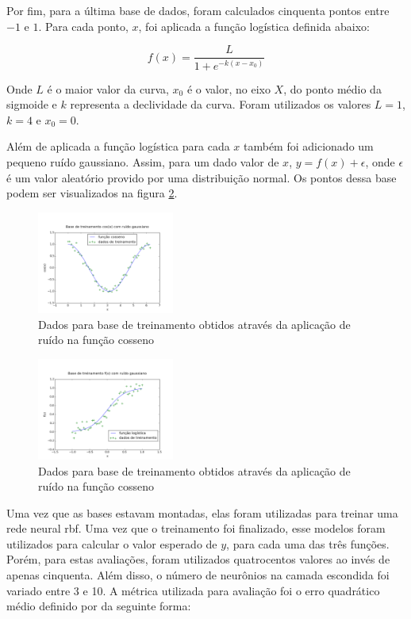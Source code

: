 \documentclass[conference]{IEEEtran}
\begin{document}
Por fim, para a última base de dados, foram calculados cinquenta pontos entre 
$-1$ e $1$. Para cada ponto, $x$, foi aplicada a função logística \cite{logist} 
definida abaixo:

$$f(x) = \frac{L}{1 + e^{-k(x-x_{0})}}$$

Onde $L$ é o maior valor da curva, $x_{0}$ é o valor, no eixo $X$, do ponto 
médio da sigmoide e $k$ representa a declividade da curva. Foram utilizados os 
valores $L = 1$, $k = 4$ e $x_{0} = 0$.

Além de aplicada a função logística para cada $x$ também foi adicionado um 
pequeno ruído gaussiano. Assim, para um dado valor de $x$, $y = f(x) + 
\epsilon$, onde $\epsilon$ é um valor aleatório provido por uma distribuição 
normal. Os pontos dessa base podem ser visualizados na figura 
\ref{fig:logistica}.

\begin{figure}[t]
	\caption{Dados para base de treinamento obtidos através da aplicação de 
		ruído na função cosseno}
	\label{fig:cosseno_dados}
	\centering
	\includegraphics[width=0.40\textwidth]{cos_5v1_train_data_paper}
\end{figure}

\begin{figure}[b]
	\caption{Dados para base de treinamento obtidos através da aplicação de 
		ruído na função cosseno}
	\label{fig:logistica}
	\centering
	\includegraphics[width=0.40\textwidth]{f_5v1_train_data_paper}
\end{figure}


Uma vez que as bases estavam montadas, elas foram utilizadas para treinar uma 
rede neural \ac*{rbf}. Uma vez que o treinamento foi finalizado, esse modelos 
foram utilizados para calcular o valor esperado de $y$, para cada uma das três 
funções. Porém, para estas avaliações, foram utilizados quatrocentos valores ao 
invés de apenas cinquenta. Além disso, o número de neurônios na camada escondida 
foi variado entre 3 e 10. A métrica utilizada para avaliação foi o erro 
quadrático médio definido por \cite{daredes} da seguinte forma: 
\end{document}
